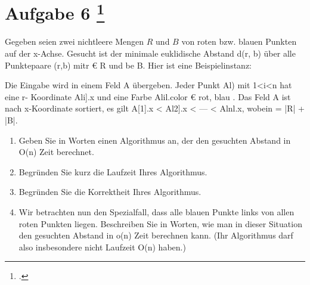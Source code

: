 \documentclass{lehramt-informatik-aufgabe}
\begin{document}

\section{Aufgabe 6
\footcite{46115:2020:03}}

Gegeben seien zwei nichtleere Mengen $R$ und $B$ von roten bzw. blauen
Punkten auf der x-Achse. Gesucht ist der minimale euklidische Abstand
d(r, b) über alle Punktepaare (r,b) mitr € R und be B. Hier ist eine
Beispielinstanz:

Die Eingabe wird in einem Feld A übergeben. Jeder Punkt Al) mit 1<i<n
hat eine r- Koordinate Ali].x und eine Farbe Alil.color € { rot, blau }.
Das Feld A ist nach x-Koordinate sortiert, \dh es gilt A[1].x < Al2].x
< --- < Alnl.x, wobein = |R| + |B|.

\begin{enumerate}


\item Geben Sie in Worten einen Algorithmus an, der den gesuchten
Abstand in O(n) Zeit berechnet.


\item Begründen Sie kurz die Laufzeit Ihres Algorithmus.


\item Begründen Sie die Korrektheit Ihres Algorithmus.


\item Wir betrachten nun den Spezialfall, dass alle blauen Punkte links
von allen roten Punkten liegen. Beschreiben Sie in Worten, wie man in
dieser Situation den gesuchten Abstand in o(n) Zeit berechnen kann. (Ihr
Algorithmus darf also insbesondere nicht Laufzeit O(n) haben.)

\end{enumerate}
\end{document}
